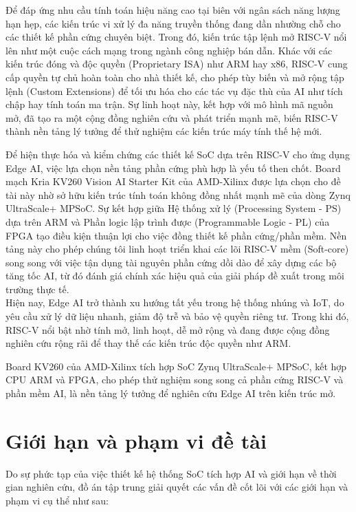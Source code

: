 Để đáp ứng nhu cầu tính toán hiệu năng cao tại biên với ngân sách năng lượng hạn hẹp, các kiến trúc vi xử lý đa năng truyền thống đang dần nhường chỗ cho các thiết kế phần cứng chuyên biệt. Trong đó, kiến trúc tập lệnh mở RISC-V nổi lên như một cuộc cách mạng trong ngành công nghiệp bán dẫn. Khác với các kiến trúc đóng và độc quyền (Proprietary ISA) như ARM hay x86, RISC-V cung cấp quyền tự chủ hoàn toàn cho nhà thiết kế, cho phép tùy biến và mở rộng tập lệnh (Custom Extensions) để tối ưu hóa cho các tác vụ đặc thù của AI như tích chập hay tính toán ma trận. Sự linh hoạt này, kết hợp với mô hình mã nguồn mở, đã tạo ra một cộng đồng nghiên cứu và phát triển mạnh mẽ, biến RISC-V thành nền tảng lý tưởng để thử nghiệm các kiến trúc máy tính thế hệ mới.

Để hiện thực hóa và kiểm chứng các thiết kế SoC dựa trên RISC-V cho ứng dụng Edge AI, việc lựa chọn nền tảng phần cứng phù hợp là yếu tố then chốt. Board mạch Kria KV260 Vision AI Starter Kit của AMD-Xilinx được lựa chọn cho đề tài này nhờ sở hữu kiến trúc tính toán không đồng nhất mạnh mẽ của dòng Zynq UltraScale+ MPSoC. Sự kết hợp giữa Hệ thống xử lý (Processing System - PS) dựa trên ARM và Phần logic lập trình được (Programmable Logic - PL) của FPGA tạo điều kiện thuận lợi cho việc đồng thiết kế phần cứng/phần mềm. Nền tảng này cho phép chúng tôi linh hoạt triển khai các lõi RISC-V mềm (Soft-core) song song với việc tận dụng tài nguyên phần cứng dồi dào để xây dựng các bộ tăng tốc AI, từ đó đánh giá chính xác hiệu quả của giải pháp đề xuất trong môi trường thực tế.\\
Hiện nay, Edge AI trở thành xu hướng tất yếu trong hệ thống nhúng và IoT, do yêu cầu xử lý dữ liệu nhanh, giảm độ trễ và bảo vệ quyền riêng tư.
Trong khi đó, RISC-V nổi bật nhờ tính mở, linh hoạt, dễ mở rộng và đang được cộng đồng nghiên cứu rộng rãi để thay thế các kiến trúc độc quyền như ARM.

Board KV260 của AMD-Xilinx tích hợp SoC Zynq UltraScale+ MPSoC, kết hợp CPU ARM và FPGA, cho phép thử nghiệm song song cả phần cứng RISC-V và phần mềm AI, là nền tảng lý tưởng để nghiên cứu Edge AI trên kiến trúc mở.

\newpage
\section{Giới hạn và phạm vi đề tài}

Do sự phức tạp của việc thiết kế hệ thống SoC tích hợp AI và giới hạn về thời gian nghiên cứu, đồ án tập trung giải quyết các vấn đề cốt lõi với các giới hạn và phạm vi cụ thể như sau:

